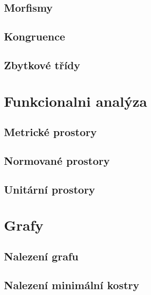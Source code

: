 \documentclass[12pt,a4paper,notitlepage,final]{article}
\begin{document}
\subsection{Morfismy}                         
\subsection{Kongruence}                       
\subsection{Zbytkové třídy}                   

\section{Funkcionalni analýza}
\subsection{Metrické prostory}               	
\subsection{Normované prostory}              	
\subsection{Unitární prostory}               	

\section{Grafy}
\subsection{Nalezení grafu}                	  
\subsection{Nalezení minimální kostry} 				

\end{document}
